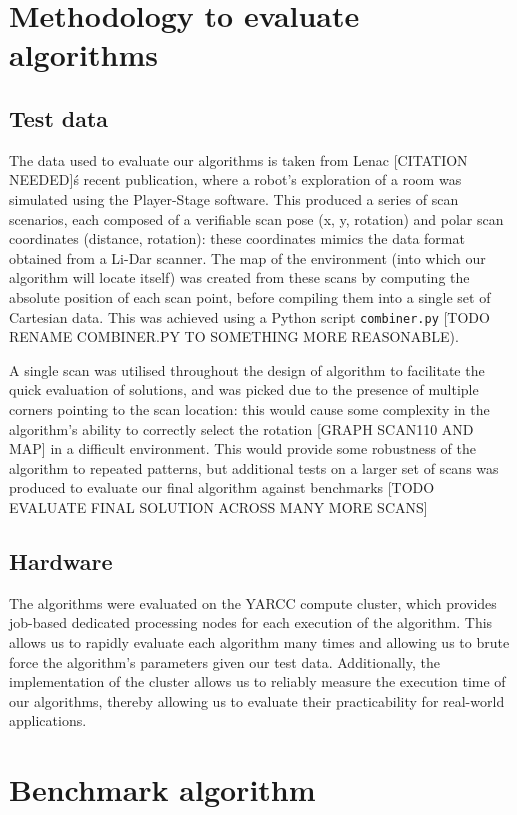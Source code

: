 \documentclass[authoryearcitations]{UoYCSproject}
\begin{document}
\section{Methodology to evaluate algorithms}
\subsection{Test data}
The data used to evaluate our algorithms is taken from Lenac [CITATION NEEDED]\'s recent publication, where a robot's exploration of a room was simulated using the Player-Stage software. This produced a series of scan scenarios, each composed of a verifiable scan pose (x, y, rotation) and polar scan coordinates (distance, rotation): these coordinates mimics the data format obtained from a Li-Dar scanner. The map of the environment (into which our algorithm will locate itself) was created from these scans by computing the absolute position of each scan point, before compiling them into a single set of Cartesian data. This was achieved using a Python script \lstinline{combiner.py} [TODO RENAME COMBINER.PY TO SOMETHING MORE REASONABLE).

A single scan was utilised throughout the design of algorithm to facilitate the quick evaluation of solutions, and was picked due to the presence of multiple corners pointing to the scan location: this would cause some complexity in the algorithm's ability to correctly select the rotation [GRAPH SCAN110 AND MAP] in a difficult environment. This would provide some robustness of the algorithm to repeated patterns, but additional tests on a larger set of scans was produced to evaluate our final algorithm against benchmarks [TODO EVALUATE FINAL SOLUTION ACROSS MANY MORE SCANS]

\subsection{Hardware}
The algorithms were evaluated on the YARCC compute cluster, which provides job-based dedicated processing nodes for each execution of the algorithm. This allows us to rapidly evaluate each algorithm many times and allowing us to brute force the algorithm's parameters given our test data. Additionally, the implementation of the cluster allows us to reliably measure the execution time of our algorithms, thereby allowing us to evaluate their practicability for real-world applications.

\section{Benchmark algorithm}
\label{sec:benchmark}
\end{document}
